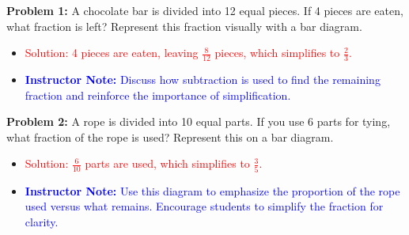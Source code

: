 \documentclass[12pt]{article}
\begin{document}
\begin{tcolorbox}[colframe=black!60, colback=white, 
coltitle=black, colbacktitle=black!15, fonttitle=\bfseries\Large, 
title=Independent Practice, halign title=center, left=10pt, right=10pt, top=10pt, bottom=15pt]

\textbf{Problem 1:} A chocolate bar is divided into 12 equal pieces. If 4 pieces are eaten, what fraction is left? Represent this fraction visually with a bar diagram.
\begin{center}
\end{center}

\begin{itemize}
    \item \textcolor{red}{Solution: 4 pieces are eaten, leaving \( \frac{8}{12} \) pieces, which simplifies to \( \frac{2}{3} \).}
    \item \textcolor{blue}{\textbf{Instructor Note:} Discuss how subtraction is used to find the remaining fraction and reinforce the importance of simplification.}
\end{itemize}

\vspace{1em}

\textbf{Problem 2:} A rope is divided into 10 equal parts. If you use 6 parts for tying, what fraction of the rope is used? Represent this on a bar diagram.
\begin{center}
\end{center}

\begin{itemize}
    \item \textcolor{red}{Solution: \( \frac{6}{10} \) parts are used, which simplifies to \( \frac{3}{5} \).}
    \item \textcolor{blue}{\textbf{Instructor Note:} Use this diagram to emphasize the proportion of the rope used versus what remains. Encourage students to simplify the fraction for clarity.}
\end{itemize}


\end{tcolorbox}
\end{document}
